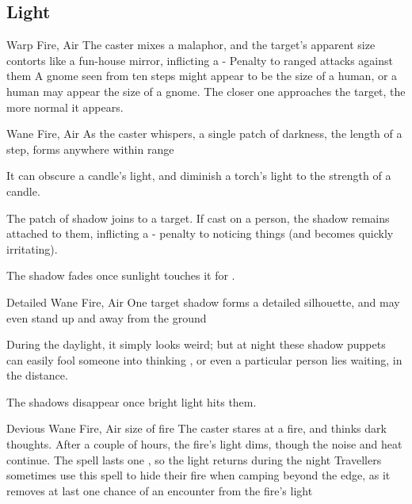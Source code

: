 \begin{multicols}{2}

\subsection{Light}
\label{lightSpells}

  {}%
  {Warp}%
  {Fire, Air}%
  {}%
  {The caster mixes a malaphor, and the target's apparent size contorts like a fun-house mirror, inflicting a - Penalty to ranged attacks against them}%
  {A gnome seen from ten steps might appear to be the size of a human, or a human may appear the size of a gnome.
    The closer one approaches the target, the more normal it appears.}



  {}%
  {Wane}%
  {Fire, Air}%
  {}%
  {As the caster whispers, a single patch of darkness, the length of a step, forms anywhere within range}%
  {It can obscure a candle's light, and diminish a torch's light to the strength of a candle.

    The patch of shadow joins to a target.
    If cast on a person, the shadow remains attached to them, inflicting a - penalty to noticing things (and becomes quickly irritating).

    The shadow fades once sunlight touches it for .}





  {Detailed}%
  {Wane}%
  {Fire, Air}%
  {}%
  {One target shadow forms a detailed silhouette, and may even stand up and away from the ground}%
  {During the daylight, it simply looks weird; but at night these shadow puppets can easily fool someone into thinking , or even a particular person lies waiting, in the distance.

  The shadows disappear once bright light hits them.}

  {Devious}%
  {Wane}%
  {Fire, Air}%
  {size of fire}%
  {The caster stares at a fire, and thinks dark thoughts.
  After a couple of hours, the fire's light dims, though the noise and heat continue.
  The spell lasts one \showOnset, so the light returns during the night}%
  {Travellers sometimes use this spell to hide their fire when camping beyond the \gls{edge}, as it removes at last one chance of an encounter from the fire's light}



\end{multicols}
